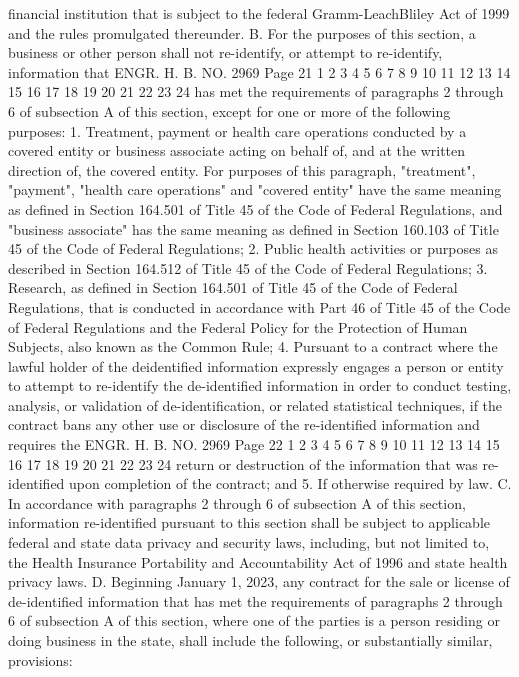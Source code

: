 financial institution that is subject to the federal Gramm-LeachBliley Act of 1999 and the rules promulgated thereunder.
B. For the purposes of this section, a business or other person
shall not re-identify, or attempt to re-identify, information that 
ENGR. H. B. NO. 2969 Page 21
1
2
3
4
5
6
7
8
9
10
11
12
13
14
15
16
17
18
19
20
21
22
23
24
has met the requirements of paragraphs 2 through 6 of subsection A
of this section, except for one or more of the following purposes:
1. Treatment, payment or health care operations conducted by a
covered entity or business associate acting on behalf of, and at the
written direction of, the covered entity. For purposes of this
paragraph, "treatment", "payment", "health care operations" and
"covered entity" have the same meaning as defined in Section 164.501
of Title 45 of the Code of Federal Regulations, and "business
associate" has the same meaning as defined in Section 160.103 of
Title 45 of the Code of Federal Regulations;
2. Public health activities or purposes as described in Section
164.512 of Title 45 of the Code of Federal Regulations;
3. Research, as defined in Section 164.501 of Title 45 of the
Code of Federal Regulations, that is conducted in accordance with
Part 46 of Title 45 of the Code of Federal Regulations and the
Federal Policy for the Protection of Human Subjects, also known as
the Common Rule;
4. Pursuant to a contract where the lawful holder of the deidentified information expressly engages a person or entity to
attempt to re-identify the de-identified information in order to
conduct testing, analysis, or validation of de-identification, or
related statistical techniques, if the contract bans any other use
or disclosure of the re-identified information and requires the 
ENGR. H. B. NO. 2969 Page 22
1
2
3
4
5
6
7
8
9
10
11
12
13
14
15
16
17
18
19
20
21
22
23
24
return or destruction of the information that was re-identified upon
completion of the contract; and
5. If otherwise required by law.
C. In accordance with paragraphs 2 through 6 of subsection A of
this section, information re-identified pursuant to this section
shall be subject to applicable federal and state data privacy and
security laws, including, but not limited to, the Health Insurance
Portability and Accountability Act of 1996 and state health privacy
laws.
D. Beginning January 1, 2023, any contract for the sale or
license of de-identified information that has met the requirements
of paragraphs 2 through 6 of subsection A of this section, where one
of the parties is a person residing or doing business in the state,
shall include the following, or substantially similar, provisions:
